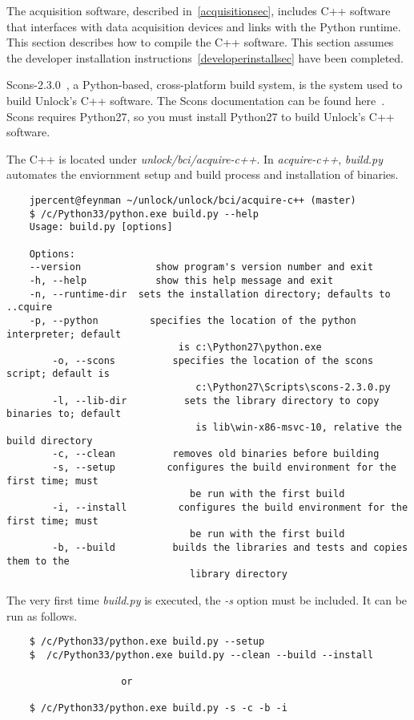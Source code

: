 \documentclass[11pt]{article}
\begin{document}
The acquisition software, described in~\ref{acquisitionsec}, includes C++ software that interfaces with data acquisition devices and links with the Python runtime.  This section describes how to compile the C++ software.  This section assumes the developer installation instructions~\ref{developerinstallsec} have been completed.  

Scons-2.3.0~\cite{scons}, a Python-based, cross-platform build system, is the system used to build Unlock's C++ software.  The Scons documentation can be found here~\cite{sconsdocs}.  Scons requires Python27, so you must install Python27 to build Unlock's C++ software.

The C++ is located under \textit{unlock/bci/acquire-c++}.   In \textit{acquire-c++}, \textit{build.py} automates the enviornment setup and build process and installation of binaries.

\begin{verbatim}
	jpercent@feynman ~/unlock/unlock/bci/acquire-c++ (master)
	$ /c/Python33/python.exe build.py --help
	Usage: build.py [options]

	Options:
  	--version             show program's version number and exit
  	-h, --help            show this help message and exit
  	-n, --runtime-dir  sets the installation directory; defaults to ..cquire
  	-p, --python         specifies the location of the python interpreter; default
        	                  is c:\Python27\python.exe
        -o, --scons          specifies the location of the scons script; default is
                                 c:\Python27\Scripts\scons-2.3.0.py
        -l, --lib-dir          sets the library directory to copy binaries to; default
                                 is lib\win-x86-msvc-10, relative the build directory
        -c, --clean          removes old binaries before building
        -s, --setup         configures the build environment for the first time; must
                                be run with the first build
        -i, --install         configures the build environment for the first time; must
                                be run with the first build
        -b, --build          builds the libraries and tests and copies them to the
                                library directory
\end{verbatim}

The very first time \textit{build.py} is executed, the \textit{-s} option must be included.  It can be run as follows.
\begin{verbatim}
    $ /c/Python33/python.exe build.py --setup
    $  /c/Python33/python.exe build.py --clean --build --install

                    or

    $ /c/Python33/python.exe build.py -s -c -b -i
\end{verbatim}
\end{document}
